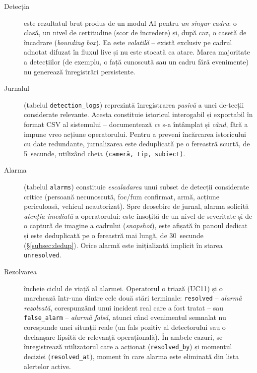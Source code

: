 \documentclass[../../main.tex]{subfiles}
\begin{document}
\begin{description}
	\item[Detecția] este rezultatul brut produs de un modul AI pentru \emph{un singur cadru}: o clasă, un nivel de certitudine (scor de încredere) și, după caz, o casetă de încadrare (\textit{bounding box}). Ea este \emph{volatilă} -- există exclusiv pe cadrul adnotat difuzat în fluxul live și nu este stocată ca atare. Marea majoritate a detecțiilor (de exemplu, o față cunoscută sau un cadru fără evenimente) nu generează înregistrări persistente.
	
	\item[Jurnalul] (tabelul \texttt{detection\_logs}) reprezintă înregistrarea \emph{pasivă} a unei de-tecții considerate relevante. Acesta constituie istoricul interogabil și exportabil în format CSV al sistemului -- documentează \emph{ce} s-a întâmplat și \emph{când}, fără a impune vreo acțiune operatorului. Pentru a preveni încărcarea istoricului cu date redundante, jurnalizarea este deduplicată pe o fereastră scurtă, de 5~secunde, utilizând cheia \texttt{(cameră, tip, subiect)}.
	
	\item[Alarma] (tabelul \texttt{alarms}) constituie \emph{escaladarea} unui subset de detecții considerate critice (persoană necunoscută, foc/fum confirmat, armă, acțiune periculoasă, vehicul neautorizat). Spre deosebire de jurnal, alarma solicită \emph{atenția imediată} a operatorului: este însoțită de un nivel de severitate și de o captură de imagine a cadrului (\textit{snapshot}), este afișată în panoul dedicat și este deduplicată pe o fereastră mai lungă, de 30~secunde (\S\ref{subsec:dedup}). Orice alarmă este inițializată implicit în starea \texttt{unresolved}.
	
	\item[Rezolvarea] încheie ciclul de viață al alarmei. Operatorul o triază (UC11) și o marchează într-una dintre cele două stări terminale: \texttt{resolved} -- \emph{alarmă rezolvată}, corespunzând unui incident real care a fost tratat -- sau \texttt{false\_alarm} -- \emph{alarmă falsă}, atunci când evenimentul semnalat nu corespunde unei situații reale (un fals pozitiv al detectorului sau o declanșare lipsită de relevanță operațională). În ambele cazuri, se înregistrează utilizatorul care a acționat (\texttt{resolved\_by}) și momentul deciziei (\texttt{resolved\_\linebreak at}), moment în care alarma este eliminată din lista alertelor active.
\end{description}
\end{document}
